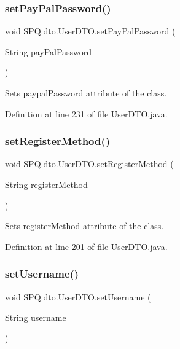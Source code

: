 \subsubsection{\texorpdfstring{set\+Pay\+Pal\+Password()}{setPayPalPassword()}}
{\footnotesize\ttfamily void S\+P\+Q.\+dto.\+User\+D\+T\+O.\+set\+Pay\+Pal\+Password (\begin{DoxyParamCaption}\item[{String}]{pay\+Pal\+Password }\end{DoxyParamCaption})}

Sets paypal\+Password attribute of the class. 

Definition at line 231 of file User\+D\+T\+O.\+java.

\mbox{\label{class_s_p_q_1_1dto_1_1_user_d_t_o_a8e4fb216f49f13c196598119a15556ea}} 
\subsubsection{\texorpdfstring{set\+Register\+Method()}{setRegisterMethod()}}
{\footnotesize\ttfamily void S\+P\+Q.\+dto.\+User\+D\+T\+O.\+set\+Register\+Method (\begin{DoxyParamCaption}\item[{String}]{register\+Method }\end{DoxyParamCaption})}

Sets register\+Method attribute of the class. 

Definition at line 201 of file User\+D\+T\+O.\+java.

\mbox{\label{class_s_p_q_1_1dto_1_1_user_d_t_o_a53003074966a77e89f5900344ab79b15}} 
\subsubsection{\texorpdfstring{set\+Username()}{setUsername()}}
{\footnotesize\ttfamily void S\+P\+Q.\+dto.\+User\+D\+T\+O.\+set\+Username (\begin{DoxyParamCaption}\item[{String}]{username }\end{DoxyParamCaption})}

